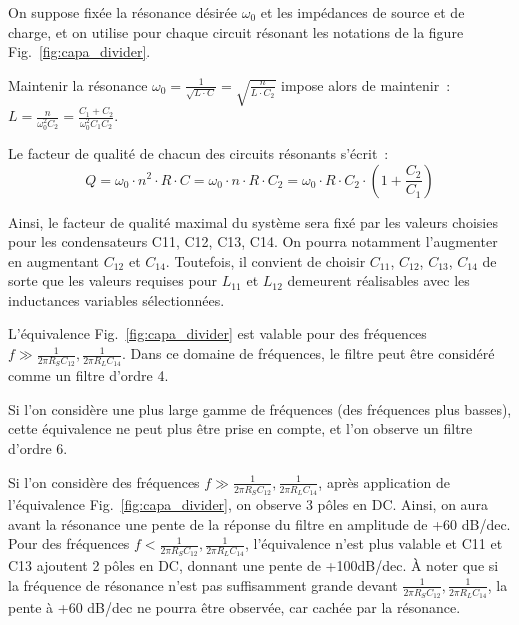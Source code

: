 \documentclass{article}
\begin{document}

On suppose fixée la résonance désirée $\omega_0$ et les impédances de source et de charge, et on utilise pour chaque circuit résonant les notations de la figure Fig.~\ref{fig:capa_divider}.

Maintenir la résonance ${\omega_0 = \frac{1}{\sqrt{L\cdot C}} = \sqrt{\frac{n}{L\cdot C_2}}}$ impose alors de maintenir~: ${L = \frac{n}{\omega_0^2 C_2} =\frac{C_1+C_2}{\omega_0^2 C_1 C_2}}$.


Le facteur de qualité de chacun des circuits résonants s'écrit~: 
\begin{equation*}
Q = \omega_0\cdot n^2\cdot R\cdot C = \omega_0\cdot n\cdot R\cdot C_2 = \omega_0\cdot R\cdot C_2\cdot (1+\frac{C_2}{C_1})
\end{equation*}

Ainsi, le facteur de qualité maximal du système sera fixé par les valeurs choisies pour les condensateurs C11, C12, C13, C14. On pourra notamment l'augmenter en augmentant $C_{12}$ et $C_{14}$. Toutefois, il convient de choisir $C_{11}$, $C_{12}$, $C_{13}$, $C_{14}$ de sorte que les valeurs requises pour $L_{11}$ et $L_{12}$ demeurent réalisables avec les inductances variables sélectionnées.




L'équivalence Fig.~\ref{fig:capa_divider} est valable pour des fréquences ${f \gg \frac{1}{2\pi R_S C_{12}}, \frac{1}{2\pi R_L C_{14}}}$. Dans ce domaine de fréquences, le filtre peut être considéré comme un filtre d'ordre 4.

Si l'on considère une plus large gamme de fréquences (des fréquences plus basses), cette équivalence ne peut plus être prise en compte, et l'on observe un filtre d'ordre 6.


Si l'on considère des fréquences ${f \gg \frac{1}{2\pi R_S C_{12}}, \frac{1}{2\pi R_L C_{14}}}$, après application de l'équivalence Fig.~\ref{fig:capa_divider}, on observe 3 pôles en DC. Ainsi, on aura avant la résonance une pente de la réponse du filtre en amplitude de +60 dB/dec.
Pour des fréquences ${f < \frac{1}{2\pi R_S C_{12}}, \frac{1}{2\pi R_L C_{14}}}$, l'équivalence n'est plus valable et C11 et C13 ajoutent 2 pôles en DC, donnant une pente de +100dB/dec.
À noter que si la fréquence de résonance n'est pas suffisamment grande devant ${\frac{1}{2\pi R_S C_{12}}, \frac{1}{2\pi R_L C_{14}}}$, la pente à +60 dB/dec ne pourra être observée, car cachée par la résonance.
\end{document}
